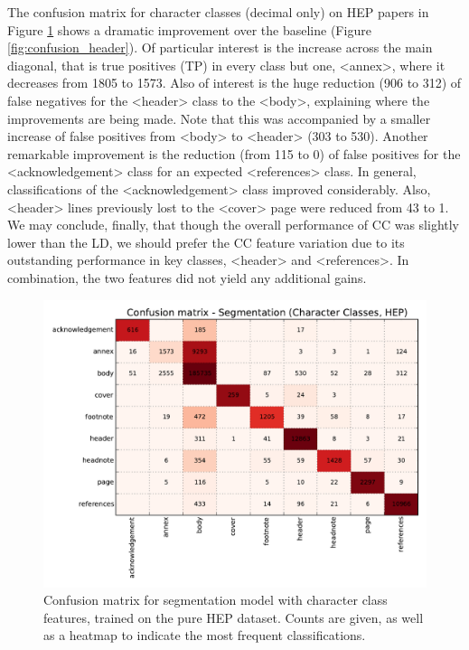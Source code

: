The confusion matrix for character classes (decimal only) on HEP papers in Figure \ref{fig:confusion_segmentation} shows a dramatic improvement over the baseline (Figure \ref{fig:confusion_header}). Of particular interest is the increase across the main diagonal, that is true positives (TP) in every class but one, <annex>, where it decreases from 1805 to 1573. Also of interest is the huge reduction (906 to 312) of false negatives for the <header> class to the <body>, explaining where the improvements are being made. Note that this was accompanied by a smaller increase of false positives from <body> to <header> (303 to 530). Another remarkable improvement is the reduction (from 115 to 0) of false positives for the <acknowledgement> class for an expected <references> class. In general, classifications of the <acknowledgement> class improved considerably. Also, <header> lines previously lost to the <cover> page were reduced from 43 to 1.  We may conclude, finally, that though the overall performance of CC was slightly lower than the LD, we should prefer the CC feature variation due to its outstanding performance in key classes, <header> and <references>. In combination, the two features did not yield any additional gains.

\begin{figure}[h]
\center
\includegraphics[width=5.5in]{Figures/classes_confusion_segmentation.pdf}
\caption{Confusion matrix for segmentation model with character class features, trained on the pure HEP dataset. Counts are given, as well as a heatmap to indicate the most frequent classifications.}
\label{fig:confusion_segmentation}
\end{figure}


